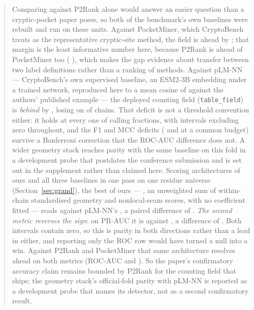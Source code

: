 \documentclass[11pt]{article}
\begin{document}
\begin{abstract}
Comparing against P2Rank alone would answer an easier question than a
cryptic-pocket paper poses, so both of the benchmark's own baselines were rebuilt
and run on these units. Against PocketMiner, which CryptoBench treats as the
representative cryptic-site method, the field is ahead by \PmAucOurs{}
\PmAucCIOurs{}; that margin is the least informative number here, because P2Rank
is ahead of PocketMiner too (\PmAucPtwoR{} \PmAucCIPtwoR{}), which makes the gap
evidence about transfer between two label definitions rather than a ranking of
methods. Against pLM-NN --- CryptoBench's own supervised baseline, an ESM2-3B
embedding under a trained network, reproduced here to a mean cosine of
\PlmFidelity{} against the authors' published example --- the deployed counting
field (\texttt{table\_field}) is \emph{behind} by \PlmAucDelta{} \PlmAucCI{},
losing on \PlmLoss{} of \NUnits{} chains. That deficit is not a threshold
convention either: it holds at every one of \CvN{} calling fractions, with
intervals excluding zero throughout, and the F1 and MCC deficits
(\PlmBudgetFDelta{} and \PlmBudgetMDelta{} at a common budget) survive a
Bonferroni correction that the ROC-AUC difference does not. A wider geometry
stack reaches parity with the same baseline on this fold in a development probe
that postdates the conference submission and is set out in the supplement rather
than claimed here. Scoring \GrandNOurs{} architectures of ours and all three
baselines in one pass on one
residue universe (Section~\ref{sec:grand}), the best of ours --- \GrandBest{},
an unweighted sum of within-chain standardised geometry and nonlocal-seam
scores, with no coefficient fitted --- reads \GrandBestRoc{} against pLM-NN's
\GrandPlmRoc{}, a paired difference of \GrandDPlmRoc{} \GrandDPlmRocCI{}.
\emph{The second metric reverses the sign}: on PR-AUC it is \GrandBestPr{}
against \GrandPlmPr{}, a difference of \GrandDPlmPr{} \GrandDPlmPrCI{}. Both
intervals contain zero, so this is parity in both directions rather than a lead
in either, and reporting only the ROC row would have turned a null into a win.
Against P2Rank and PocketMiner that same architecture resolves ahead on both
metrics (ROC-AUC \GrandDPTwoRoc{} \GrandDPTwoRocCI{} and \GrandDPmRoc{}
\GrandDPmRocCI{}). So the paper's confirmatory
accuracy claim remains bounded by P2Rank for the counting field that ships; the
geometry stack's official-fold parity with pLM-NN is reported as a development
probe that names its detector, not as a second confirmatory result.


\end{abstract}
\end{document}
